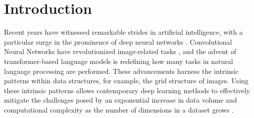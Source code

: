 \section{Introduction}
\label{s_Introduction}

Recent years have witnessed remarkable strides in artificial intelligence, with a particular surge in the prominence of deep neural networks \cite{prado-romero_survey_2023}. Convolutional Neural Networks have revolutionized image-related tasks \cite{szegedy_going_2015}, and the advent of transformer-based language models \cite{vaswani_attention_2017, brown_language_2020} is redefining how many tasks in natural language processing are performed. These advancements harness the intrinsic patterns within data structures, for example, the grid structure of images. Using these intrinsic patterns allows contemporary deep learning methods to effectively mitigate the challenges posed by an exponential increase in data volume and computational complexity as the number of dimensions in a dataset grows \cite{bronstein_geometric_2017, bronstein_geometric_2021, bellman_dynamic_1966}.


